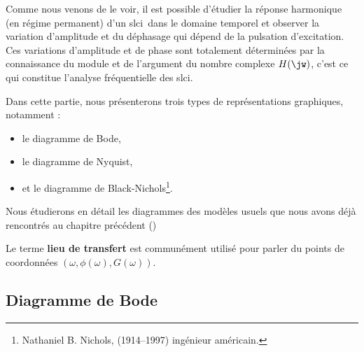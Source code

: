 Comme nous venons de le voir, il est possible d'étudier
la réponse harmonique (en régime permanent) d'un \gls{slci}~dans le domaine 
temporel et observer la variation d'amplitude et du 
déphasage qui dépend de la pulsation d'excitation. Ces variations 
d'amplitude et de phase sont totalement déterminées par la 
connaissance du module et de l'argument du nombre complexe $H(\jw)$, 
c'est ce qui constitue l'analyse fréquentielle des \gls{slci}.

Dans cette partie, nous présenterons trois types de représentations graphiques, 
notamment :
\begin{itemize}
    \item le diagramme de Bode,
    \item le diagramme de Nyquist,
    \item et le diagramme de Black-Nichols\footnote{
    Nathaniel B. Nichols, (1914–1997) 
           ingénieur américain.}. 
\end{itemize}
Nous étudierons en détail les diagrammes des modèles usuels que nous 
avons déjà rencontrés au chapitre précédent ()

Le terme \textbf{lieu de transfert} est communément utilisé pour parler du 
points de coordonnées $(\omega, \phi(\omega),G(\omega))$.


\subsection{Diagramme de Bode}

